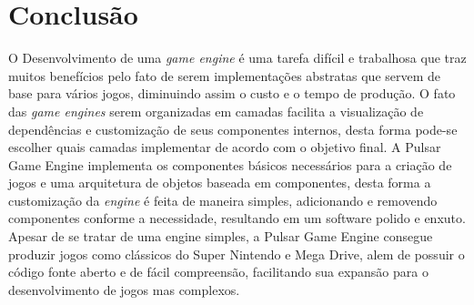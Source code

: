 \documentclass[12pt,	openright, twoside,	a4paper, english, french, spanish, brazil]{abntex2}
\begin{document}
%
%

\chapter{Conclusão} \label{cap: conclusao}
O Desenvolvimento de uma \textit{game engine} é uma tarefa difícil e trabalhosa que traz muitos benefícios pelo fato de serem implementações abstratas que servem de base para vários jogos, diminuindo assim o custo e o tempo de produção. O fato das \textit{game engines} serem organizadas em camadas facilita a visualização de dependências e customização de seus componentes internos, desta forma pode-se escolher quais camadas implementar de acordo com o objetivo final. A Pulsar Game Engine implementa os componentes básicos necessários para a criação de jogos e uma arquitetura de objetos baseada em componentes, desta forma a customização da \textit{engine} é feita de maneira simples, adicionando e removendo componentes conforme a necessidade, resultando em um software polido e enxuto. \\
Apesar de se tratar de uma engine simples, a Pulsar Game Engine consegue produzir jogos como clássicos do Super Nintendo e Mega Drive, alem de possuir o código fonte aberto e de fácil compreensão, facilitando sua expansão para o desenvolvimento de jogos mas complexos.



\postextual

%



\printindex
\end{document}
